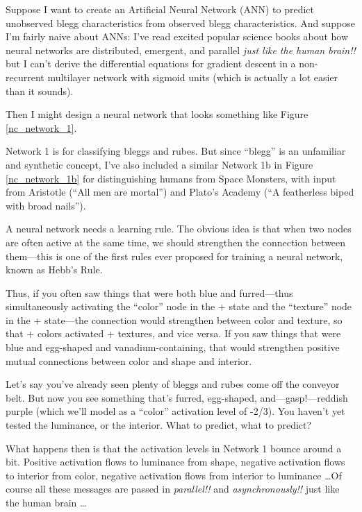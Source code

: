 {
 Suppose I want to create an Artificial Neural Network (ANN) to
predict unobserved blegg characteristics from observed blegg
characteristics. And suppose I'm fairly naive about
ANNs: I've read excited popular science books about how
neural networks are distributed, emergent, and parallel \textit{just
like the human brain!!} but I can't derive the
differential equations for gradient descent in a non-recurrent
multilayer network with sigmoid units (which is actually a lot easier
than it sounds).}

{
 Then I might design a neural network that looks something like
Figure \ref{nc_network_1}.}


{
 Network 1 is for classifying bleggs and rubes. But since
``blegg'' is an unfamiliar and
synthetic concept, I've also included a similar Network
1b in Figure \ref{nc_network_1b} for distinguishing humans from Space Monsters, with
input from Aristotle (``All men are
mortal'') and Plato's Academy
(``A featherless biped with broad
nails'').}


{
 A neural network needs a learning rule. The obvious idea is that
when two nodes are often active at the same time, we should strengthen
the connection between them---this is one of the first rules ever
proposed for training a neural network, known as Hebb's
Rule.}

{
 Thus, if you often saw things that were both blue and
furred---thus simultaneously activating the
``color'' node in the + state and
the ``texture'' node in the +
state---the connection would strengthen between color and texture, so
that + colors activated + textures, and vice versa. If you saw things
that were blue and egg-shaped and vanadium-containing, that would
strengthen positive mutual connections between color and shape and
interior.}

{
 Let's say you've already seen
plenty of bleggs and rubes come off the conveyor belt. But now you see
something that's furred, egg-shaped,
and---gasp!---reddish purple (which we'll model as a
``color'' activation level of -2/3).
You haven't yet tested the luminance, or the interior.
What to predict, what to predict?}

{
 What happens then is that the activation levels in Network 1
bounce around a bit. Positive activation flows to luminance from shape,
negative activation flows to interior from color, negative activation
flows from interior to luminance \ldots Of course all these messages are
passed in \textit{parallel!!} and \textit{asynchronously!!} just like
the human brain \ldots}

